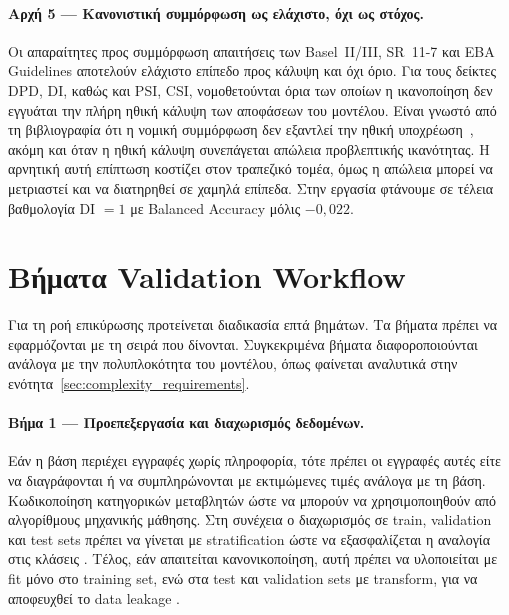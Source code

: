 \paragraph{Αρχή 5 --- Κανονιστική συμμόρφωση ως ελάχιστο, όχι ως στόχος.}
Οι απαραίτητες προς συμμόρφωση απαιτήσεις των Basel~II/III,
SR~11-7 και EBA Guidelines \citep{basel2017, sr117, eba2023} αποτελούν ελάχιστο επίπεδο προς
κάλυψη και όχι όριο. Για τους δείκτες DPD, DI, καθώς και PSI,
CSI, νομοθετούνται όρια των οποίων η ικανοποίηση δεν εγγυάται
την πλήρη ηθική κάλυψη των αποφάσεων του μοντέλου. Είναι
γνωστό από τη βιβλιογραφία ότι η νομική συμμόρφωση δεν
εξαντλεί την ηθική υποχρέωση~\citep{barocas2019fairness, selbst2019fairness},
ακόμη και όταν η ηθική κάλυψη συνεπάγεται απώλεια
προβλεπτικής ικανότητας. Η αρνητική αυτή επίπτωση κοστίζει
στον τραπεζικό τομέα, όμως η απώλεια μπορεί να μετριαστεί
και να διατηρηθεί σε χαμηλά επίπεδα. Στην εργασία φτάνουμε
σε τέλεια βαθμολογία DI $= 1$ με Balanced Accuracy μόλις
$-0{,}022$.

\section{Βήματα Validation Workflow}
\label{sec:workflow}

Για τη ροή επικύρωσης προτείνεται διαδικασία επτά βημάτων.
Τα βήματα πρέπει να εφαρμόζονται με τη σειρά που δίνονται.
Συγκεκριμένα βήματα διαφοροποιούνται ανάλογα με την
πολυπλοκότητα του μοντέλου, όπως φαίνεται αναλυτικά στην
ενότητα~\ref{sec:complexity_requirements}.

\paragraph{Βήμα 1 --- Προεπεξεργασία και διαχωρισμός δεδομένων.}
Εάν η βάση περιέχει εγγραφές χωρίς πληροφορία, τότε πρέπει
οι εγγραφές αυτές είτε να διαγράφονται ή να συμπληρώνονται
με εκτιμώμενες τιμές ανάλογα με τη βάση. Κωδικοποίηση
κατηγορικών μεταβλητών ώστε να μπορούν να χρησιμοποιηθούν
από αλγορίθμους μηχανικής μάθησης. Στη συνέχεια ο
διαχωρισμός σε train, validation και test sets πρέπει να
γίνεται με stratification ώστε να εξασφαλίζεται η αναλογία 
στις κλάσεις \citep{kohavi1995study}. Τέλος, εάν απαιτείται 
κανονικοποίηση, αυτή πρέπει να υλοποιείται με fit μόνο στο training 
set, ενώ στα test και validation sets με transform, για να αποφευχθεί 
το data leakage \citep{kaufman2012leakage, kapoor2023leakage}.

